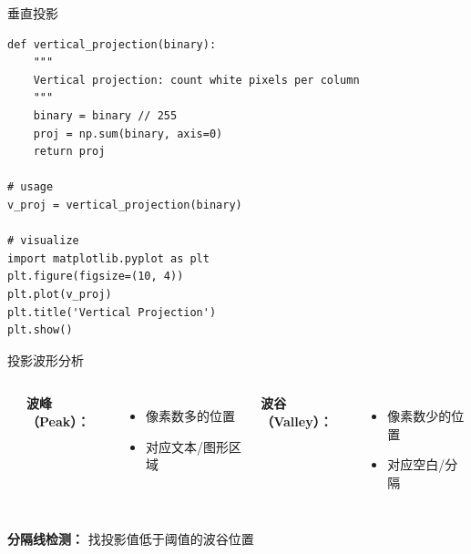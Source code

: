 \begin{frame}[fragile]{垂直投影}
    \begin{lstlisting}[basicstyle=\ttfamily\scriptsize]
def vertical_projection(binary):
    """
    Vertical projection: count white pixels per column
    """
    binary = binary // 255
    proj = np.sum(binary, axis=0)
    return proj

# usage
v_proj = vertical_projection(binary)

# visualize
import matplotlib.pyplot as plt
plt.figure(figsize=(10, 4))
plt.plot(v_proj)
plt.title('Vertical Projection')
plt.show()
    \end{lstlisting}

\end{frame}

\begin{frame}{投影波形分析}
    \begin{columns}
        \begin{center}
        \end{center}

        \textbf{波峰（Peak）：}
        \begin{itemize}
            \item 像素数多的位置
            \item 对应文本/图形区域
        \end{itemize}

        \textbf{波谷（Valley）：}
        \begin{itemize}
            \item 像素数少的位置
            \item 对应空白/分隔
        \end{itemize}
    \end{columns}

    \vspace{0.3cm}

    \textbf{分隔线检测：} 找投影值低于阈值的波谷位置
\end{frame}


